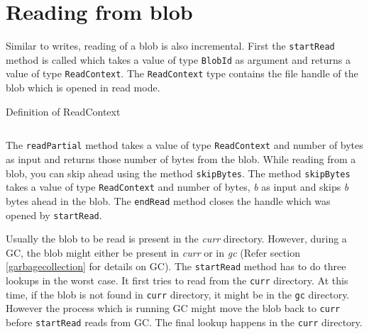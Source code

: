 \section{Reading from blob} \label{readblob}
Similar to writes, reading of a blob is also incremental. First the \texttt{startRead} method is called which takes a value of type \texttt{BlobId} as argument and returns a value of type \texttt{ReadContext}. The \texttt{ReadContext} type  contains the file handle of the blob which is opened in read mode.

\begin{program}
  \caption{Definition of ReadContext}
  \label{fig:defreadcontext}
  \inputminted{haskell}{hs/readcontext.hs}
\end{program}

The \texttt{readPartial} method takes a value of type \texttt{ReadContext} and number of bytes as input and returns those number of bytes from the blob.
While reading from a blob, you can skip ahead using the method \texttt{skipBytes}. The method \texttt{skipBytes} takes a value of type \texttt{ReadContext} and number of bytes, \textit{b} as input and skips \textit{b} bytes ahead in the blob.
The \texttt{endRead} method closes the handle which was opened by \texttt{startRead}.

Usually the blob to be read is present in the \textit{curr} directory. However, during a GC, the blob might either be present in \textit{curr} or in \textit{gc} (Refer section \ref{garbagecollection} for details on GC). The \texttt{startRead} method has to do three lookups in the worst case. It first tries to read from the \texttt{curr} directory.
At this time, if the blob is not found in \texttt{curr} directory, it might be in the \texttt{gc} directory. However the process which is running GC might move the blob back to \texttt{curr} before \texttt{startRead} reads from GC. The final lookup happens in the \texttt{curr} directory.

